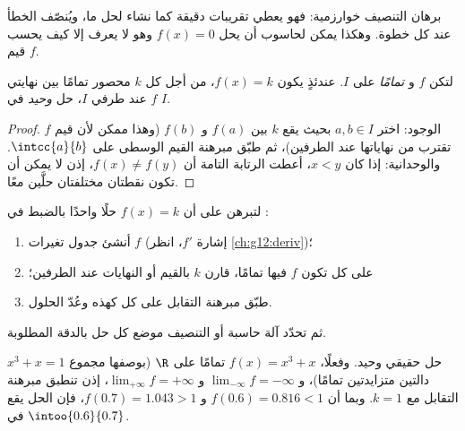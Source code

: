 \begin{remark}
برهان التنصيف خوارزمية: فهو يعطي تقريبات دقيقة كما نشاء
لحل ما، ويُنصّف الخطأ عند كل خطوة. وهكذا يمكن لحاسوب أن
يحل $f(x) = 0$ وهو لا يعرف إلا كيف يحسب قيم $f$.
\end{remark}

\begin{theorem}\label{thm:g12:limcont:bijection}
لتكن $f$  و\emph{ تمامًا} على  $I$. عندئذٍ
يكون  $f(x) = k$، من أجل كل $k$ محصور تمامًا بين نهايتي $f$ عند طرفي $I$،
حل \emph{وحيد} في $I$.
\end{theorem}

\begin{proof}
الوجود: اختر $a, b \in I$ بحيث يقع $k$ بين $f(a)$ و $f(b)$ (وهذا ممكن
لأن قيم $f$ تقترب من نهاياتها عند الطرفين)، ثم طبّق
مبرهنة القيم الوسطى على $\intcc{a}{b}$. والوحدانية: إذا كان $x < y$، أعطت
الرتابة التامة أن $f(x) \neq f(y)$، إذن لا يمكن أن تكون نقطتان مختلفتان
حلَّين معًا.
\end{proof}

\begin{method}[حل $f(x) = k$ بمبرهنة التقابل]\label{met:g12:limcont:bijection}
لتبرهن على أن  $f(x) = k$ حلًا واحدًا بالضبط في :
\begin{enumerate}
  \item أنشئ جدول تغيرات $f$ (إشارة $f'$، انظر
        \cref{ch:g12:deriv})؛
  \item على كل  تكون $f$ فيها   تمامًا،
        قارن $k$ بالقيم أو النهايات عند الطرفين؛
  \item طبّق مبرهنة التقابل على كل  كهذه وعُدّ
        الحلول.
\end{enumerate}
ثم تحدّد آلة حاسبة أو التنصيف موضع كل حل بالدقة المطلوبة.
\end{method}

\begin{example}\label{ex:g12:limcont:cubic}
 $x^3 + x = 1$ حل حقيقي وحيد. وفعلًا،
$f(x) = x^3 + x$   تمامًا على $\R$ (بوصفها مجموع
دالتين متزايدتين تمامًا)، و $\lim_{-\infty} f = -\infty$ و
$\lim_{+\infty} f = +\infty$، إذن تنطبق مبرهنة التقابل مع $k = 1$.
وبما أن $f(0.6) = 0.816 < 1$ و $f(0.7) = 1.043 > 1$، فإن الحل يقع في
$\intoo{0.6}{0.7}$.
\end{example}

